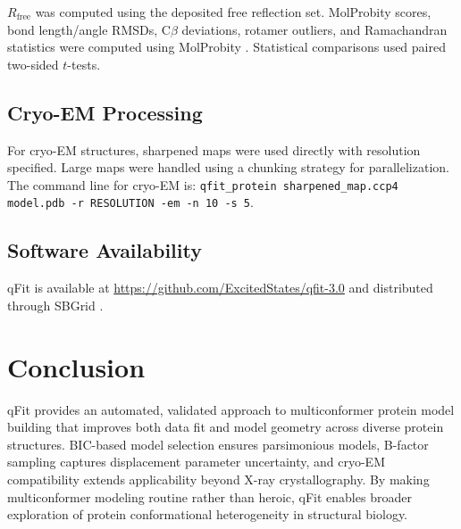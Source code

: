 \documentclass[11pt]{article}
\begin{document}
$R_{\text{free}}$ was computed using the deposited free reflection set. MolProbity scores, bond length/angle RMSDs, C$\beta$ deviations, rotamer outliers, and Ramachandran statistics were computed using MolProbity \citep{molprobity_chen2010}. Statistical comparisons used paired two-sided $t$-tests.

\subsection{Cryo-EM Processing}

For cryo-EM structures, sharpened maps were used directly with resolution specified. Large maps were handled using a chunking strategy for parallelization. The command line for cryo-EM is: \texttt{qfit\_protein sharpened\_map.ccp4 model.pdb -r RESOLUTION -em -n 10 -s 5}.

\subsection{Software Availability}

qFit is available at \url{https://github.com/ExcitedStates/qfit-3.0} and distributed through SBGrid \citep{sbgrid2013}.

\section{Conclusion}

qFit provides an automated, validated approach to multiconformer protein model building that improves both data fit and model geometry across diverse protein structures. BIC-based model selection ensures parsimonious models, B-factor sampling captures displacement parameter uncertainty, and cryo-EM compatibility extends applicability beyond X-ray crystallography. By making multiconformer modeling routine rather than heroic, qFit enables broader exploration of protein conformational heterogeneity in structural biology.



\end{document}
